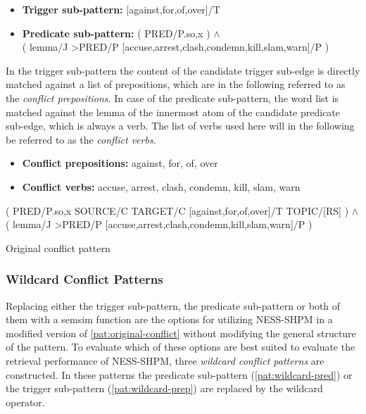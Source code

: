 \documentclass[11pt]{scrreprt}
\begin{document}
\begin{itemize}
	\item \textbf{\textsf{Trigger sub-pattern:}} \textsf{[against,for,of,over]/T}
	\item \textbf{\textsf{Predicate sub-pattern:}}
		\textsf{( PRED/P.{so,x} ) \(\wedge\) \\ ( lemma/J >PRED/P [accuse,arrest,clash,condemn,kill,slam,warn]/P )}
\end{itemize}

In the trigger sub-pattern the content of the candidate trigger sub-edge is directly matched against a list of prepositions, which are in the following referred to as the \textit{conflict prepositions}. In case of the predicate sub-pattern, the word list is matched against the lemma of the innermost atom of the candidate predicate sub-edge, which is always a verb. The list of verbs used here will in the following be referred to as the \textit{conflict verbs}.

\begin{itemize}
	\item \textbf{\textsf{Conflict prepositions:}} against, for, of, over
	\item \textbf{\textsf{Conflict verbs:}} accuse, arrest, clash, condemn, kill, slam, warn
\end{itemize}


\begin{pattern}
  \normalfont\sffamily
  \centering
  ( PRED/P.{so,x} SOURCE/C TARGET/C [against,for,of,over]/T TOPIC/[RS] ) \(\wedge\) \\
  ( lemma/J >PRED/P [accuse,arrest,clash,condemn,kill,slam,warn]/P )
  \caption{Original conflict pattern}
  \label{pat:original-conflict}
\end{pattern}


\subsubsection{Wildcard Conflict Patterns}
\label{sec:wildcard-conflict-patterns}
Replacing either the trigger sub-pattern, the predicate sub-pattern or both of them with a semsim function are the options for utilizing NESS-SHPM in a modified version of \cref{pat:original-conflict} without modifying the general structure of the pattern. To evaluate which of these options are best suited to evaluate the retrieval performance of NESS-SHPM, three \textit{wildcard conflict patterns} are constructed. In these patterns the predicate sub-pattern (\cref{pat:wildcard-pred}) or the trigger sub-pattern (\cref{pat:wildcard-prep}) are replaced by the wildcard operator. 
\end{document}
